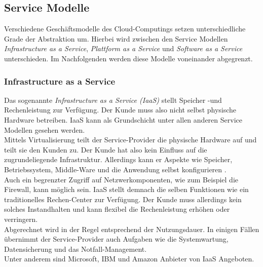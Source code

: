 \subsection{Service Modelle}
Verschiedene Geschäftsmodelle des Cloud-Computings setzen unterschiedliche Grade der Abstraktion um. Hierbei wird zwischen den Service Modellen \textit{Infrastructure as a Service}, \textit{Plattform as a Service} und \textit{Software as a Service} unterschieden. Im Nachfolgenden werden diese Modelle voneinander abgegrenzt.
\subsubsection{Infrastructure as a Service}
Das sogenannte\textit{ Infrastructure as a Service (IaaS)}\cite{mell_nist_2011} stellt Speicher -und Rechenleistung zur Verfügung. Der Kunde muss also nicht selbst physische Hardware betreiben. IaaS kann als Grundschicht unter allen anderen Service Modellen gesehen werden.\\
Mittels Virtualisierung teilt der Service-Provider die physische Hardware auf und teilt sie den Kunden zu. Der  Kunde hat also kein Einfluss auf die zugrundeliegende Infrastruktur. Allerdings kann er Aspekte wie Speicher, Betriebssystem, Middle-Ware und die Anwendung selbst konfigurieren \cite{dimpi_rani_rajiv_kumar_ranjan_comparative_2014}.\\
Auch ein begrenzter Zugriff auf Netzwerkomponenten, wie zum Beispiel die Firewall, kann möglich sein. IaaS stellt demnach die selben Funktionen wie ein traditionelles  Rechen-Center zur Verfügung. Der Kunde muss allerdings kein solches Instandhalten und kann flexibel die Rechenleistung erhöhen oder verringern. \\
Abgerechnet wird in der Regel entsprechend der Nutzungsdauer. In einigen Fällen übernimmt der Service-Provider auch Aufgaben wie die Systemwartung, Datensicherung und das Notfall-Management.\\
Unter anderem sind Microsoft, IBM und Amazon Anbieter von IaaS Angeboten. \cite{simon_lohmann_iaas_nodate} \cite{mell_nist_2011}

